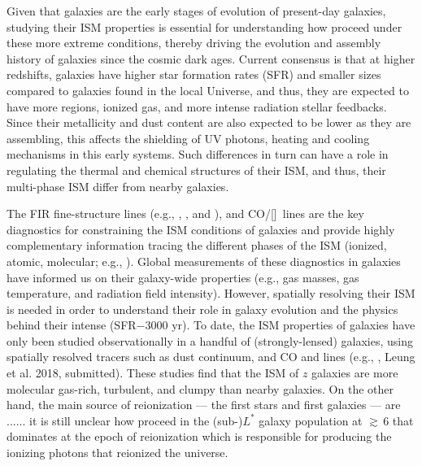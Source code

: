 \documentclass[iop]{emulateapj} %
\begin{document}
Given that \highz galaxies are the early stages of evolution of present-day galaxies, studying their ISM properties is essential for understanding how \SF proceed under these more extreme conditions, thereby driving the evolution and assembly history of galaxies 
since the cosmic dark ages.
Current consensus is that at higher redshifts, galaxies have higher 
star formation rates (SFR) \citep{Behroozi13b, Sparre15a, Maiolino15a, Dunlop17a} and 
smaller sizes \citep[e.g.,][]{Bouwens11a, Ono13a} compared to galaxies found in the local Universe, 
and thus, they are expected to have more  regions, ionized gas, and more intense radiation stellar feedbacks. 
Since their metallicity and dust content are also expected to be lower as they are assembling, 
this affects the shielding of UV photons, heating and cooling mechanisms in this early systems. Such differences in turn can have a role in regulating the thermal and chemical structures of their ISM, and thus, their multi-phase ISM differ from nearby galaxies.
%
% 

The FIR fine-structure lines (e.g., \cii, \nii, and \oiii), and CO/[\ci]~lines are the key diagnostics for
constraining the ISM conditions of galaxies and
provide highly complementary information tracing the different phases of the ISM (ionized,
atomic, molecular; e.g., \citealt{Scoville74a, Rubin85a, Malhotra01a}).
Global measurements of these diagnostics in \highz galaxies
have informed us on their galaxy-wide properties (e.g.,
gas masses, gas temperature, and radiation field intensity).
However, spatially resolving their ISM is needed in order to understand their role in galaxy evolution and
the physics behind their intense \SF (SFR$-$3000\,\Msun\,yr\pmOne).
To date, the ISM properties of \highz galaxies
have only been studied observationally in a handful of (strongly-lensed)
galaxies, using spatially resolved tracers such as
dust continuum, and CO and \cii lines (e.g., \citealt{Swinbank11a, Hodge15a, Ferkinhoff15a, Hodge16a},
Leung et al. 2018, submitted).
These studies find that the ISM of $z$ galaxies are more
molecular gas-rich, turbulent, and clumpy than nearby galaxies.
On the other hand, the main source of reionization --- the first stars and first galaxies --- 
are ......
it is still unclear how \SF proceed in the (sub-)$L^*$ galaxy population at \z$\gtrsim$\,6
that dominates  \SF at the epoch of reionization which is responsible for producing the
ionizing photons that reionized the universe.
\end{document}
